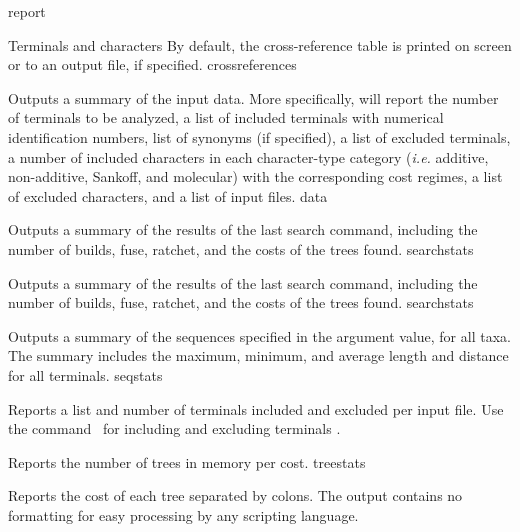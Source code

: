 \begin{command}{report}{}
\begin{arguments}
\begin{argumentgroup}{Terminals and characters}
{                By default, the cross-reference table is printed on screen or to an
                output file, if specified.}
                {crossreferences}

                {Outputs a summary of the input data.
                More specifically, \poy will report the number of
                terminals to be analyzed, a list of included terminals with
                numerical identification numbers, list
                of synonyms (if specified), a list of excluded terminals, a
                number of included characters in each character-type category
                (\emph{i.e.} additive, non-additive, Sankoff, and molecular) with the corresponding
                cost regimes, a list of excluded
                characters, and a list of input files.} 
                {data}

                {Outputs a summary of the results of the last search command,
                including the number of builds, fuse, ratchet, and the costs of
                the trees found.}
                {searchstats}

                {Outputs a summary of the results of the last search command,
                including the number of builds, fuse, ratchet, and the costs of
                the trees found.}
                {searchstats}

                {Outputs a summary of the sequences specified in the argument
                value, for all taxa. The summary includes the maximum, minimum,
                and average length and distance for all terminals.}
                {seqstats}

                {Reports a list and number of terminals included and excluded
                per input file. Use the command~ for including and excluding
                terminals .}
                {}

                {Reports the number of trees in memory per cost.}
                {treestats}

                {Reports the cost of each tree separated by colons. The output
                contains no formatting for easy processing by any scripting
                language.}
                {}


\end{argumentgroup}
\end{arguments}
\end{command}
